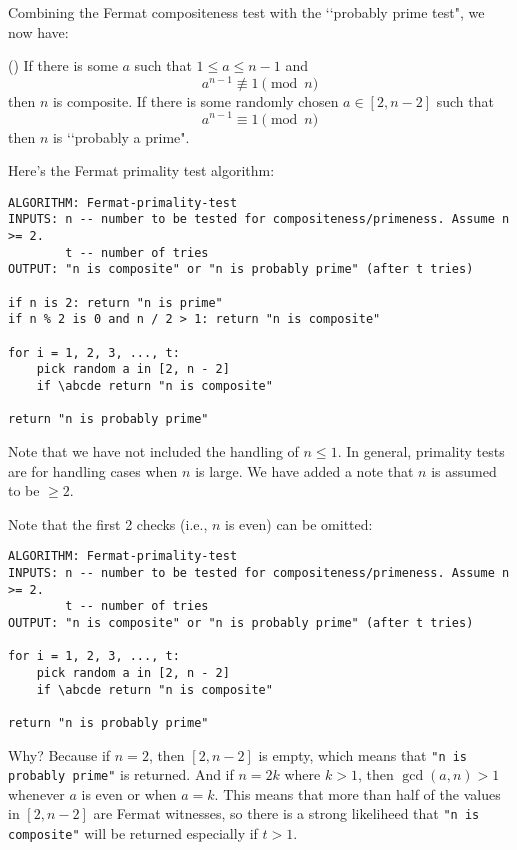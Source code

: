 Combining the Fermat compositeness test with the \lq\lq probably prime test",
we now have:

\begin{prop} \textnormal{()}
  If there is some $a$ such that $1 \leq a \leq n - 1$ and
  \[
  a^{n-1} \not\equiv 1 \pmod{n}
  \]
  then $n$ is composite.
  If there is some randomly chosen $a \in [2, n-2]$ such that 
  \[
  a^{n-1} \equiv 1 \pmod{n}
  \]
  then $n$ is \lq\lq probably a prime".
\end{prop}

Here's the Fermat primality test algorithm:
\begin{Verbatim}[frame=single,fontsize=\footnotesize,commandchars=\\\{\}]
ALGORITHM: Fermat-primality-test
INPUTS: n -- number to be tested for compositeness/primeness. Assume n >= 2.
        t -- number of tries
OUTPUT: "n is composite" or "n is probably prime" (after t tries)

if n is 2: return "n is prime"
if n % 2 is 0 and n / 2 > 1: return "n is composite"

for i = 1, 2, 3, ..., t:
    pick random a in [2, n - 2]
    if \abcde return "n is composite"

return "n is probably prime"
\end{Verbatim}
Note that we have not included the handling of $n \leq 1$.
In general, primality tests are for handling cases when $n$ is large.
We have added a note that $n$ is assumed to be $\geq 2$.

Note that the first 2 checks (i.e., $n$ is even) can be omitted:
\begin{Verbatim}[frame=single,fontsize=\footnotesize,commandchars=\\\{\}]
ALGORITHM: Fermat-primality-test
INPUTS: n -- number to be tested for compositeness/primeness. Assume n >= 2.
        t -- number of tries
OUTPUT: "n is composite" or "n is probably prime" (after t tries)

for i = 1, 2, 3, ..., t:
    pick random a in [2, n - 2]
    if \abcde return "n is composite"

return "n is probably prime"
\end{Verbatim}
Why?
Because if $n = 2$, then $[2, n - 2]$ is empty, which means that
\texttt{"n is probably prime"} is returned.
And if $n = 2k$ where $k > 1$, then $\gcd(a, n) > 1$
whenever $a$ is even or when $a = k$.
This means that more than half of the values in $[2, n-2]$
are Fermat witnesses, so there is a strong likeliheed that
\verb!"n is composite"! will be returned especially if $t > 1$.

